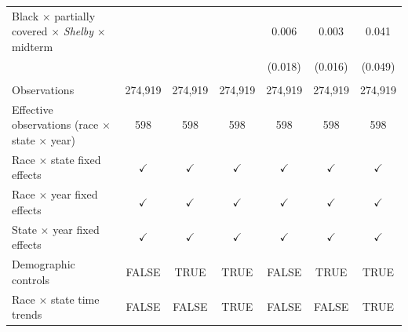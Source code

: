 \begin{tabular}{lcccccc}
   Black $\times$ partially covered $\times$ \textit{Shelby} $\times$ midterm          &               &               &               & 0.006         & 0.003         & 0.041\\   
                                                                                       &               &               &               & (0.018)       & (0.016)       & (0.049)\\   
    \\
   Observations                                                                        & 274,919       & 274,919       & 274,919       & 274,919       & 274,919       & 274,919\\  
   Effective observations (race $\times$ state $\times$ year)                          & 598           & 598           & 598           & 598           & 598           & 598\\  
   \midrule 
   Race $\times$ state fixed effects                                                   & $\checkmark$  & $\checkmark$  & $\checkmark$  & $\checkmark$  & $\checkmark$  & $\checkmark$\\   
   Race $\times$ year fixed effects                                                    & $\checkmark$  & $\checkmark$  & $\checkmark$  & $\checkmark$  & $\checkmark$  & $\checkmark$\\   
   State $\times$ year fixed effects                                                   & $\checkmark$  & $\checkmark$  & $\checkmark$  & $\checkmark$  & $\checkmark$  & $\checkmark$\\   
   Demographic controls                                                                & FALSE         & TRUE          & TRUE          & FALSE         & TRUE          & TRUE\\  
   Race $\times$ state time trends                                                     & FALSE         & FALSE         & TRUE          & FALSE         & FALSE         & TRUE\\  
   \bottomrule
\end{tabular}
\par\endgroup


